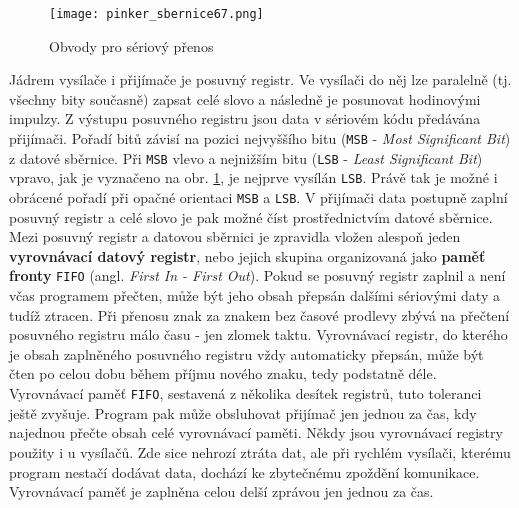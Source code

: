       \begin{figure}[ht!] %
        \centering
        \texttt{[image: pinker\_sbernice67.png]}
        \caption{Obvody pro sériový přenos}
        \label{MIT:fig_sbernice67}
      \end{figure}
      
      Jádrem vysílače i přijímače je posuvný registr. Ve vysílači do něj lze paralelně (tj. všechny 
      bity současně) zapsat celé slovo a následně je posunovat hodinovými impulzy. Z výstupu 
      posuvného registru jsou data v sériovém kódu předávána přijímači. Pořadí bitů závisí na 
      pozici nejvyššího bitu (\texttt{MSB} - \emph{Most Significant Bit}) z datové sběrnice. Při 
      \texttt{MSB} vlevo a nejnižším bitu  (\texttt{LSB} - \emph{Least Significant Bit}) vpravo, 
      jak je vyznačeno na obr. \ref{MIT:fig_sbernice67}, je nejprve vysílán \texttt{LSB}. Právě tak 
      je možné i obrácené pořadí při opačné orientaci \texttt{MSB} a \texttt{LSB}. V přijímači data 
      postupně zaplní posuvný registr a celé slovo je pak možné číst prostřednictvím datové 
      sběrnice. Mezi posuvný registr a datovou sběrnici je zpravidla vložen alespoň jeden 
      \textbf{vyrovnávací datový registr}, nebo jejich skupina organizovaná jako \textbf{paměť 
      fronty} \texttt{FIFO} (angl. \emph{First In - First Out}). Pokud se posuvný registr 
      zaplnil a není včas programem přečten, může být jeho obsah přepsán dalšími sériovými daty a 
      tudíž ztracen. Při přenosu znak za znakem bez časové prodlevy zbývá na přečtení posuvného 
      registru málo času - jen zlomek taktu. Vyrovnávací registr, do kterého je obsah zaplněného 
      posuvného registru vždy automaticky přepsán, může být čten po celou dobu během příjmu nového 
      znaku, tedy podstatně déle. Vyrovnávací paměť \texttt{FIFO}, sestavená z několika desítek 
      registrů, tuto toleranci ještě zvyšuje. Program pak může obsluhovat přijímač jen jednou za 
      čas, kdy najednou přečte obsah celé vyrovnávací paměti. Někdy jsou vyrovnávací registry 
      použity i u vysílačů. Zde sice nehrozí ztráta dat, ale při rychlém vysílači, kterému program 
      nestačí dodávat data, dochází ke zbytečnému zpoždění komunikace. Vyrovnávací paměť je 
      zaplněna celou delší zprávou jen jednou za čas.
      
